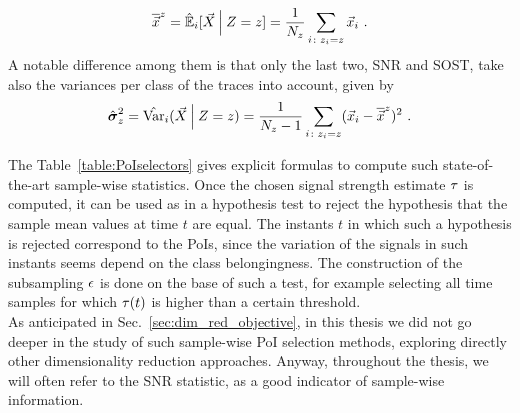 \begin{equation}
\overline{\vec{x}}^{z}= \hat{\mathbb{E}}_i[\vec{X} \:\Big\vert\: Z = z] = \frac{1}{N_{z}}\sum_{i\colon z_i=z} \vec{x}_i  \mbox{ .}
\end{equation} 
A notable difference among them is that only the last two, SNR and SOST, take also the variances per class of the traces into account, given by
\begin{equation}
\hat{\boldsymbol{\sigma}}^2_{z} = \hat{\mathrm{Var}}_i(\vec{X} \:\Big\vert\: Z = z) = \frac{1}{N_{z}-1}\sum_{i\colon z_i=z} (\vec{x}_i - \overline{\vec{x}}^{z})^2 \mbox{ .}
\end{equation}

The Table~\ref{table:PoIselectors} gives explicit formulas to compute such state-of-the-art sample-wise statistics. Once the chosen signal strength estimate $\tau$ is computed, it can be used as in a hypothesis test to reject the hypothesis that the sample mean values at time $t$ are equal. The instants $t$ in which such a hypothesis is rejected correspond to the PoIs, since the variation of the signals in such instants seems depend on the class belongingness. The construction of the subsampling $\epsilon$ is done on the base of such a test, for example selecting all time samples for which $\tau(t)$ is higher than a certain threshold. \\

As anticipated in Sec.~\ref{sec:dim_red_objective}, in this thesis we did not go deeper in the study of such sample-wise PoI selection methods, exploring directly other dimensionality reduction approaches. Anyway, throughout the thesis, we will often refer to the SNR statistic, as a good indicator of sample-wise information.

